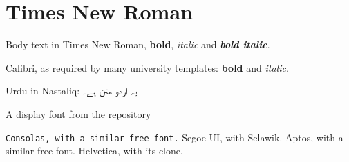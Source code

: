 \documentclass{article}
\begin{document}
\section{Times New Roman}
Body text in Times New Roman, \textbf{bold}, \textit{italic} and \textbf{\textit{bold italic}}.

{\sffamily Calibri, as required by many university templates: \textbf{bold} and \textit{italic}.}

Urdu in Nastaliq: \texturdu{یہ اردو متن ہے۔}

{\display\Large A display font from the repository}

\texttt{Consolas, with a similar free font.} {\segoe Segoe UI, with Selawik.} {\aptos Aptos, with a similar free font.} {\helv Helvetica, with its clone.}
\end{document}
